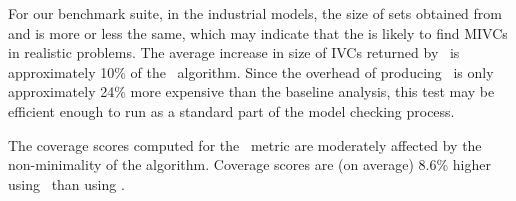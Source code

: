 For our benchmark suite, in the industrial models, the size of sets obtained from \ucbfalg and \ucalg is more or less the same, which may indicate that the \ucalg is likely to find MIVCs in realistic problems.  The average increase in size of IVCs returned by \ucalg\ is approximately 10\% of the \ucbfalg\ algorithm.  Since the overhead of producing \ucalg\ is only approximately 24\% more expensive than the baseline analysis, this test may be efficient enough to run as a standard part of the model checking process.  %

The coverage scores computed for the \ivccov\ metric
are moderately affected by the non-minimality of the \ucalg algorithm.  Coverage scores are (on average) 8.6\% higher using \ucalg\ than using \ucbfalg.
%
%
%

